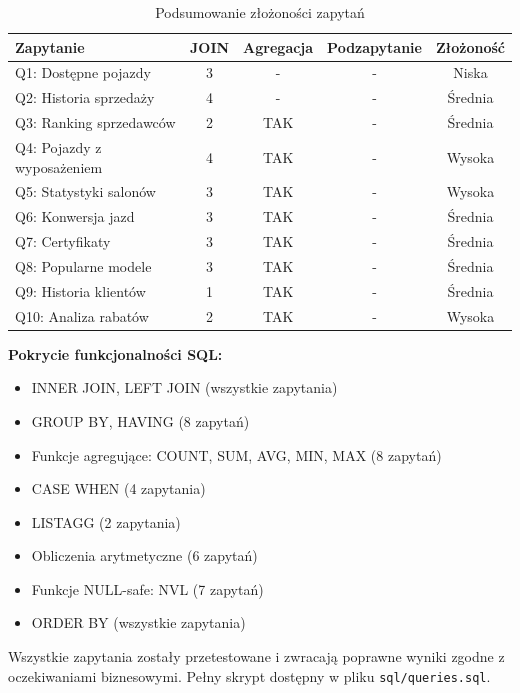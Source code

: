 \documentclass[a4paper,titleauthor]{mwart}
\begin{document}
	\begin{table}[H]
	\centering
	\small
	\begin{tabular}{|l|c|c|c|c|}
	\hline
	\textbf{Zapytanie} & \textbf{JOIN} & \textbf{Agregacja} & \textbf{Podzapytanie} & \textbf{Złożoność} \\
	\hline
	Q1: Dostępne pojazdy & 3 & - & - & Niska \\
	Q2: Historia sprzedaży & 4 & - & - & Średnia \\
	Q3: Ranking sprzedawców & 2 & TAK & - & Średnia \\
	Q4: Pojazdy z wyposażeniem & 4 & TAK & - & Wysoka \\
	Q5: Statystyki salonów & 3 & TAK & - & Wysoka \\
	Q6: Konwersja jazd & 3 & TAK & - & Średnia \\
	Q7: Certyfikaty & 3 & TAK & - & Średnia \\
	Q8: Popularne modele & 3 & TAK & - & Średnia \\
	Q9: Historia klientów & 1 & TAK & - & Średnia \\
	Q10: Analiza rabatów & 2 & TAK & - & Wysoka \\
	\hline
	\end{tabular}
	\caption{Podsumowanie złożoności zapytań}
	\end{table}

	\textbf{Pokrycie funkcjonalności SQL:}
	\begin{itemize}
		\item INNER JOIN, LEFT JOIN (wszystkie zapytania)
		\item GROUP BY, HAVING (8 zapytań)
		\item Funkcje agregujące: COUNT, SUM, AVG, MIN, MAX (8 zapytań)
		\item CASE WHEN (4 zapytania)
		\item LISTAGG (2 zapytania)
		\item Obliczenia arytmetyczne (6 zapytań)
		\item Funkcje NULL-safe: NVL (7 zapytań)
		\item ORDER BY (wszystkie zapytania)
	\end{itemize}

	Wszystkie zapytania zostały przetestowane i zwracają poprawne wyniki 
	zgodne z oczekiwaniami biznesowymi. Pełny skrypt dostępny w pliku 
	\texttt{sql/queries.sql}.
	\newpage



\end{document}
